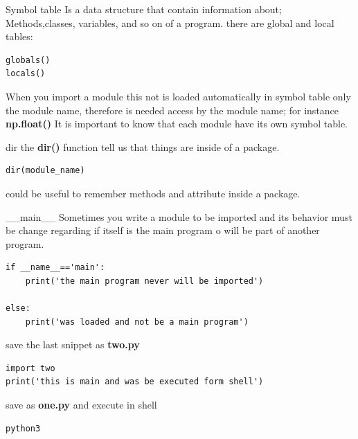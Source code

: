 \documentclass{beamer}
\begin{document}
\begin{frame}[fragile]{Symbol table}
Is a data structure that contain information about; Methods,classes, variables, and so on of a program.
there are global and local tables:
\begin{lstlisting}
globals()
locals()
\end{lstlisting}
When you import a module this not is loaded automatically in symbol table
only the module name, therefore is needed access by the module name; for instance \textbf{np.float()} It
is important to know that each module have its own symbol table.
\end{frame}





\begin{frame}[fragile]{dir}
the \textbf{dir()} function tell us that things are inside of a package.
\begin{lstlisting}
dir(module_name)
\end{lstlisting}
could be useful to remember methods and attribute inside a package.
\end{frame}


\begin{frame}[fragile]{\_\_main\_\_}
Sometimes you write a module to be imported and its behavior must be change regarding if itself is the main program o will be part of another program.
\begin{lstlisting}
if __name__=='main':
	print('the main program never will be imported')
	
else:
	print('was loaded and not be a main program')
\end{lstlisting}
save the last snippet as \textbf{two.py}

\begin{lstlisting}
import two
print('this is main and was be executed form shell')	
\end{lstlisting}
save as \textbf{one.py} and execute in shell
\begin{verbatim}
python3 
\end{verbatim}
\end{frame}
\end{document}
